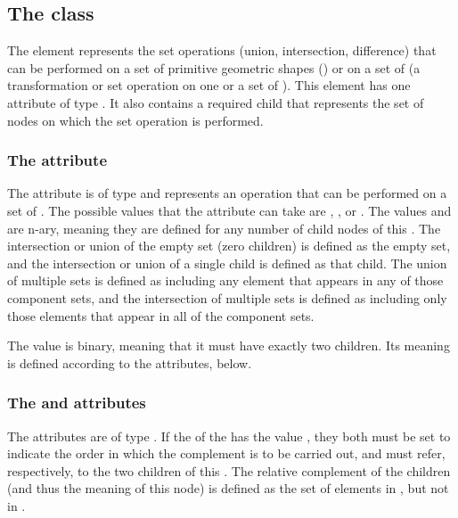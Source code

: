 \subsection{The  class}
\label{csgsetoperator-class}
The \CSGSetOperator element represents the set operations (union, intersection, difference) that can be performed on a set of primitive geometric shapes (\CSGPrimitives) or on a set of \CSGNodes (a transformation or set operation on one or a set of \CSGPrimitives). This element has one attribute of type . It also contains a required child \ListOfCSGNodes that represents the set of nodes on which the set operation is performed.

\subsubsection{The \fixttspace{} attribute}
The  attribute is of type  and represents an operation that can be performed on a set of \CSGNodes. The possible values that the  attribute can take are , , or .  The values  and  are n-ary, meaning they are defined for any number of child nodes of this \CSGSetOperator.  The intersection or union of the empty set (zero children) is defined as the empty set, and the intersection or union of a single child is defined as that child.  The union of multiple sets is defined as including any element that appears in any of those component sets, and the intersection of multiple sets is defined as including only those elements that appear in all of the component sets.

The value  is binary, meaning that it must have exactly two children.  Its meaning is defined according to the  attributes, below.

\subsubsection{The \fixttspace{} and  attributes}
The  attributes are of type .  If the  of the \CSGSetOperator has the value , they both must be set to indicate the order in which the complement is to be carried out, and must refer, respectively, to the two  children of this \CSGSetOperator.  The relative complement of the children (and thus the meaning of this node) is defined as the set of elements in , but not in .  


